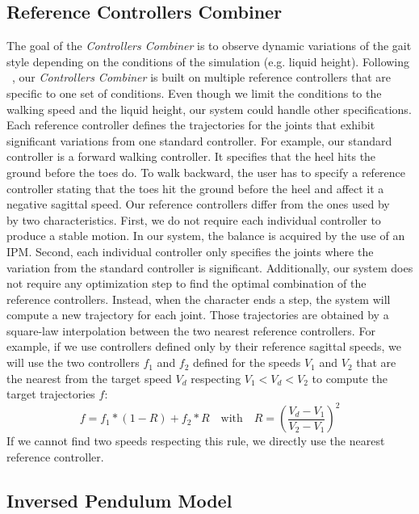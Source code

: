 \documentclass[conference]{acmsiggraph}
\begin{document}
\subsection{Reference Controllers Combiner}
\label{sec:multi_state}

The goal of the \textit{Controllers Combiner} is to observe dynamic variations of the gait style depending on the conditions of the simulation (e.g. liquid height). Following ~\cite{coros2009robust}, our \textit{Controllers Combiner} is built on multiple reference controllers that are specific to one set of conditions. Even though we limit the conditions to the walking speed and the liquid height, our system could handle other specifications. Each reference controller defines the trajectories for the joints that exhibit significant variations from one standard controller. For example, our standard controller is a forward walking controller. It specifies that the heel hits the ground before the toes do. To walk backward, the user has to specify a reference controller stating that the toes hit the ground before the heel and affect it a negative sagittal speed. Our reference controllers differ from the ones used by ~\cite{coros2009robust} by two characteristics. First, we do not require each individual controller to produce a stable motion. In our system, the balance is acquired by the use of an IPM. Second, each individual controller only specifies the joints where the variation from the standard controller is significant. Additionally, our system does not require any optimization step to find the optimal combination of the reference controllers. Instead, when the character ends a step, the system will compute a new trajectory for each joint. Those trajectories are obtained by a square-law interpolation between the two nearest reference controllers. For example, if we use controllers defined only by their reference sagittal speeds, we will use the two controllers $f_1$ and $f_2$ defined for the speeds $V_1$ and $V_2$ that are the nearest from the target speed $V_d$ respecting $V_1 < V_d < V_2$ to compute the target trajectories $f$: 
$$
f=f_1*(1-R)+f_2*R   \quad \textrm{with} \quad   R=\left( \frac{V_d-V_1}{V_2-V_1} \right) ^2
$$
If we cannot find two speeds respecting this rule, we directly use the nearest reference controller. 

\subsection{Inversed Pendulum Model}
\label{sec:IPM}
\end{document}
